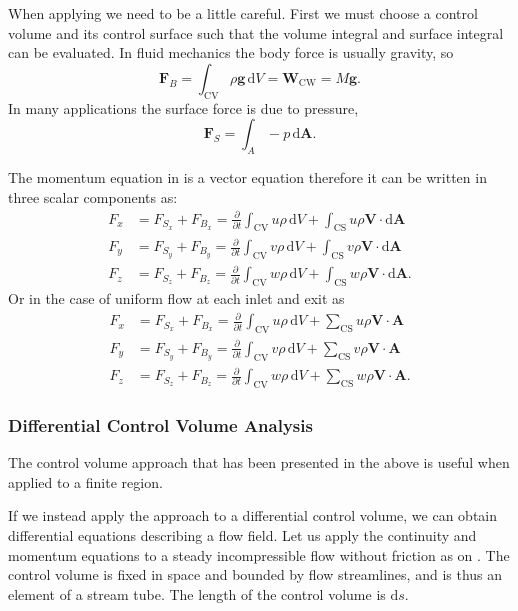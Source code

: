 When applying  we need to be a little careful. First we must choose a control volume and its control surface such that the volume integral and surface integral can be evaluated. In fluid mechanics the body force is usually gravity, so
\[ 
\textbf{F}_B = \int_{\mathrm{CV}} \rho \textbf{g} \, \mathrm{d}V = \textbf{W}_{\mathrm{CW}} = M \textbf{g}
.\]
In many applications the surface force is due to pressure,
\[ 
\textbf{F}_S = \int_A - p \, \mathrm{d}\textbf{A}
.\]

The momentum equation in  is a vector equation therefore it can be written in three scalar components as:
\begin{align*}
  F_x &= F_{S_x} + F_{B_x} = \frac{\partial }{\partial t} \int_{\mathrm{CV}} u \rho \, \mathrm{d}V + \int_{\mathrm{CS}} u \rho \textbf{V} \cdot \mathrm{d}\textbf{A} \\
    F_y &= F_{S_y} + F_{B_y} = \frac{\partial }{\partial t} \int_{\mathrm{CV}} v \rho \, \mathrm{d}V + \int_{\mathrm{CS}} v \rho \textbf{V} \cdot \mathrm{d}\textbf{A} \\
  F_z &= F_{S_z} + F_{B_z} = \frac{\partial }{\partial t} \int_{\mathrm{CV}} w \rho \, \mathrm{d}V + \int_{\mathrm{CS}} w \rho \textbf{V} \cdot \mathrm{d}\textbf{A}
.\end{align*}
Or in the case of uniform flow at each inlet and exit as
\begin{align*}
  F_x &= F_{S_x} + F_{B_x} = \frac{\partial }{\partial t}\int_{\mathrm{CV}} u \rho \, \mathrm{d}V + \sum_{\mathrm{CS}} u \rho \textbf{V} \cdot \textbf{A} \\
    F_y &= F_{S_y} + F_{B_y} = \frac{\partial }{\partial t}\int_{\mathrm{CV}} v \rho \, \mathrm{d}V + \sum_{\mathrm{CS}} v \rho \textbf{V} \cdot \textbf{A} \\
  F_z &= F_{S_z} + F_{B_z} = \frac{\partial }{\partial t}\int_{\mathrm{CV}} w \rho \, \mathrm{d}V + \sum_{\mathrm{CS}} w \rho \textbf{V} \cdot \textbf{A}
.\end{align*}

\subsubsection{Differential Control Volume Analysis}
The control volume approach that has been presented in the above is useful when applied to a finite region.

If we instead apply the approach to a differential control volume, we can obtain differential equations describing a flow field. Let us apply the continuity and momentum equations to a steady incompressible flow without friction as on . The control volume is fixed in space and bounded by flow streamlines, and is thus an element of a stream tube. The length of the control volume is $\mathrm{d}s$. 

